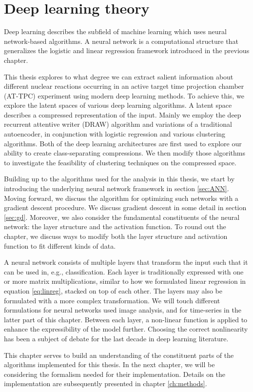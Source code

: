 \chapter{Deep learning theory}\label{ch:ml}

Deep learning describes the subfield of machine learning which uses neural network-based algorithms. A neural network is a computational structure that generalizes the logistic and linear regression framework introduced in the previous chapter.

This thesis explores to what degree we can extract salient information about different nuclear reactions occurring in an active target time projection chamber (AT-TPC) experiment using modern deep learning methods. To achieve this, we explore the latent spaces of various deep learning algorithms. A latent space describes a compressed representation of the input. Mainly we employ the deep recurrent attentive writer (DRAW) algorithm \cite{Gregor2015} and variations of a traditional autoencoder, in conjunction with logistic regression and various clustering algorithms. Both of the deep learning architectures are first used to explore our ability to create class-separating compressions. We then modify those algorithms to investigate the feasibility of clustering techniques on the compressed space. 

Building up to the algorithms used for the analysis in this thesis, we start by introducing the underlying neural network framework in section \ref{sec:ANN}. Moving forward, we discuss the algorithm for optimizing such networks with a gradient descent procedure. We discuss gradient descent in some detail in section \ref{sec:gd}. Moreover, we also consider the fundamental constituents of the neural network: the layer structure and the activation function. To round out the chapter, we discuss ways to modify both the layer structure and activation function to fit different kinds of data.

A neural network consists of multiple layers that transform the input such that it can be used in, e.g., classification. Each layer is traditionally expressed with one or more matrix multiplications, similar to how we formulated linear regression in equation \ref{eq:linreg}, stacked on top of each other. The layers may also be formulated with a more complex transformation. We will touch different formulations for neural networks used image analysis, and for time-series in the latter part of this chapter.  Between each layer, a non-linear function is applied to enhance the expressibility of the model further. Choosing the correct nonlinearity has been a subject of debate for the last decade in deep learning literature.

This chapter serves to build an understanding of the constituent parts of the algorithms implemented for this thesis. In the next chapter, we will be considering the formalism needed for their implementation. Details on the implementation are subsequently presented in chapter \ref{ch:methods}.